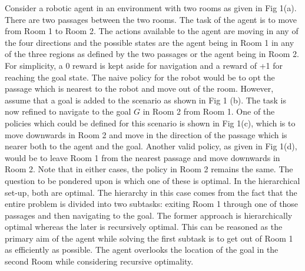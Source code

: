 Consider a robotic agent in an environment with two rooms as given in Fig 1(a). There are two passages between the two rooms. The task of the agent is to move from Room 1 to Room 2. The actions available to the agent are moving in any of the four directions and the possible states are the agent being in Room 1 in any of the three regions as defined by the two passages or the agent being in Room 2.  For simplicity, a 0 reward is kept aside for navigation and a reward of +1 for reaching the goal state. The naive policy for the robot would be to opt the passage which is nearest to the robot and move out of the room. However, assume that a goal is added to the scenario as shown in Fig 1 (b). The task is now refined to navigate to the goal \(G\) in Room 2 from Room 1. One of the policies which could be defined for this scenario is shown in Fig 1(c), which is to move downwards in Room 2 and move in the direction of the passage which is nearer both to the agent and the goal. Another valid policy, as given in Fig 1(d), would be to leave Room 1 from the nearest passage and move downwards in Room 2. Note that in either cases, the policy in Room 2 remains the same. The question to be pondered upon is which one of these is optimal. In the hierarchical set-up, both are optimal. The hierarchy in this case comes from the fact that the entire problem is divided into two subtasks: exiting Room 1 through one of those passages and then navigating to the goal. The former approach is hierarchically optimal whereas the later is recursively optimal. This can be reasoned as the primary aim of the agent while solving the first subtask is to get out of Room 1 as efficiently as possible. The agent overlooks the location of the goal in the second Room while considering recursive optimality. 


